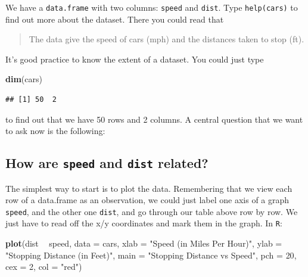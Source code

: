 \documentclass[]{book}
\newenvironment{Shaded}{\begin{snugshade}}{\end{snugshade}}
\newcommand{\KeywordTok}[1]{\textcolor[rgb]{0.13,0.29,0.53}{\textbf{#1}}}
\newcommand{\DataTypeTok}[1]{\textcolor[rgb]{0.13,0.29,0.53}{#1}}
\newcommand{\DecValTok}[1]{\textcolor[rgb]{0.00,0.00,0.81}{#1}}
\newcommand{\StringTok}[1]{\textcolor[rgb]{0.31,0.60,0.02}{#1}}
\newcommand{\OperatorTok}[1]{\textcolor[rgb]{0.81,0.36,0.00}{\textbf{#1}}}
\newcommand{\NormalTok}[1]{#1}
\theoremstyle{definition}
\theoremstyle{definition}
\theoremstyle{definition}
\theoremstyle{remark}
\begin{document}
We have a \texttt{data.frame} with two columns: \texttt{speed} and
\texttt{dist}. Type \texttt{help(cars)} to find out more about the
dataset. There you could read that

\begin{quote}
The data give the speed of cars (mph) and the distances taken to stop
(ft).
\end{quote}

It's good practice to know the extent of a dataset. You could just type

\begin{Shaded}
\begin{Highlighting}[]
\KeywordTok{dim}\NormalTok{(cars)}
\end{Highlighting}
\end{Shaded}

\begin{verbatim}
## [1] 50  2
\end{verbatim}

to find out that we have 50 rows and 2 columns. A central question that
we want to ask now is the following:

\subsection{\texorpdfstring{How are \texttt{speed} and \texttt{dist}
related?}{How are speed and dist related?}}\label{how-are-speed-and-dist-related}

The simplest way to start is to plot the data. Remembering that we view
each row of a data.frame as an observation, we could just label one axis
of a graph \texttt{speed}, and the other one \texttt{dist}, and go
through our table above row by row. We just have to read off the x/y
coordinates and mark them in the graph. In \texttt{R}:

\begin{Shaded}
\begin{Highlighting}[]
\KeywordTok{plot}\NormalTok{(dist }\OperatorTok{~}\StringTok{ }\NormalTok{speed, }\DataTypeTok{data =}\NormalTok{ cars,}
     \DataTypeTok{xlab =} \StringTok{"Speed (in Miles Per Hour)"}\NormalTok{,}
     \DataTypeTok{ylab =} \StringTok{"Stopping Distance (in Feet)"}\NormalTok{,}
     \DataTypeTok{main =} \StringTok{"Stopping Distance vs Speed"}\NormalTok{,}
     \DataTypeTok{pch  =} \DecValTok{20}\NormalTok{,}
     \DataTypeTok{cex  =} \DecValTok{2}\NormalTok{,}
     \DataTypeTok{col  =} \StringTok{"red"}\NormalTok{)}
\end{Highlighting}
\end{Shaded}
\end{document}
